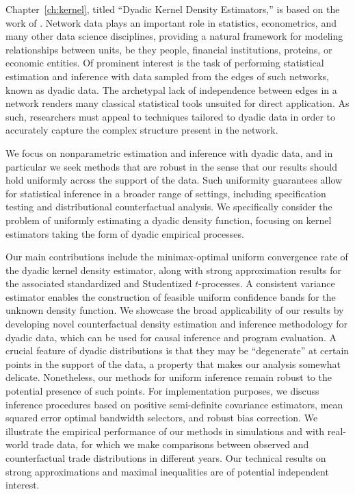 \documentclass[11pt,lof]{puthesis}
\theoremstyle{break}
\theoremstyle{proof}
\begin{document}
Chapter~\ref{ch:kernel}, titled ``Dyadic Kernel Density Estimators,'' is based
on the work of \citet{cattaneo2024uniform}. Network data plays an important role
in statistics, econometrics, and many other data science disciplines, providing
a natural framework for modeling relationships between units, be they people,
financial institutions, proteins, or economic entities. Of prominent interest
is the task of performing statistical estimation and inference with data
sampled from the edges of such networks, known as dyadic data. The archetypal
lack of independence between edges in a network renders many classical
statistical tools unsuited for direct application. As such, researchers must
appeal to techniques tailored to dyadic data in order to accurately capture the
complex structure present in the network.

We focus on nonparametric estimation and inference with dyadic data, and in
particular we seek methods that are robust in the sense that our results should
hold uniformly across the support of the data. Such uniformity guarantees allow
for statistical inference in a broader range of settings, including
specification testing and distributional counterfactual analysis. We
specifically consider the problem of uniformly estimating a dyadic density
function, focusing on kernel estimators taking the form of dyadic empirical
processes.

Our main contributions include the minimax-optimal uniform convergence rate of
the dyadic kernel density estimator, along with strong approximation results
for the associated standardized and Studentized $t$-processes. A consistent
variance estimator enables the construction of feasible uniform confidence
bands for the unknown density function. We showcase the broad applicability of
our results by developing novel counterfactual density estimation and inference
methodology for dyadic data, which can be used for causal inference and program
evaluation.
A crucial feature of dyadic distributions is that they may be ``degenerate'' at
certain points in the support of the data, a property that makes our analysis
somewhat delicate. Nonetheless, our methods for uniform inference remain robust
to the potential presence of such points.
For implementation purposes, we discuss inference procedures based on positive
semi-definite covariance estimators, mean squared error optimal bandwidth
selectors, and robust bias correction. We illustrate the empirical performance
of our methods in simulations and with real-world trade data, for which we make
comparisons between observed and counterfactual trade distributions in
different years. Our technical results on strong approximations and maximal
inequalities are of potential independent interest.
\end{document}
